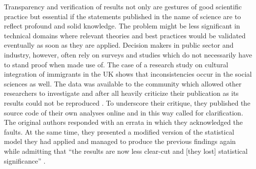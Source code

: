 \documentclass{sig-alternate}
\begin{document}
Transparency and verification of results not only are gestures of good scientific practice but essential if the statements published in the name of science are to reflect profound and solid knowledge.
The problem might be less significant in technical domains where relevant theories and best practices would be validated eventually as soon as they are applied.
Decision makers in public sector and industry, however, often rely on surveys and studies which do not necessarily have to stand proof when made use of. 
The case of a research study on cultural integration of immigrants in the UK  
shows that inconsistencies occur in the social sciences as well.
The data was available to the community \cite{dataset_FNSEM} which allowed other researchers to investigate and after all heavily criticize their publication as its results could not be reproduced \cite{arai2011fragile}.
To underscore their critique, they published the source code of their own analyses online and in this way called for clarification. %
The original authors responded with an errata in which they acknowledged the faults.
At the same time, they presented a modified version of the statistical model they had applied and managed to produce the previous findings again while admitting that ``the results are now less clear-cut and [they lost] statistical significance'' \cite{bisin2011errata}.
%
%
 
\end{document}
